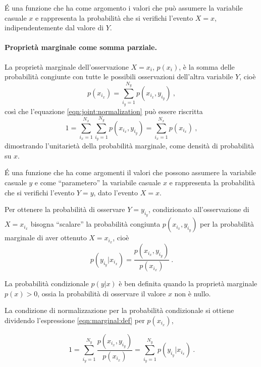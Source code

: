 \begin{definition}
   \'E una funzione che ha come argomento i valori che può assumere la variabile casuale $x$ e rappresenta la probabilità che si verifichi l'evento $X=x$, indipendentemente dal valore di $Y$.
\end{definition}

\paragraph{Proprietà marginale come somma parziale.} La proprietà marginale dell'osservazione $X=x_i$, $p(x_i)$, è la somma delle probabilità congiunte con tutte le possibili osservazioni dell'altra variabile $Y$, cioè
\begin{equation}\label{eqn:marginal:def}
    p(x_{i_x}) = \sum_{i_y = 1}^{N_y} p(x_{i_x}, y_{i_y}) \ ,
\end{equation}
così che l'equazione \ref{eqn:joint:normalization} può essere riscritta
\begin{equation}
    1 = \sum_{i_x = 1}^{N_x} \sum_{i_y = 1}^{N_y} p(x_{i_x}, y_{i_y}) = 
        \sum_{i_x = 1}^{N_x} p(x_{i_x}) \ ,
\end{equation}
dimostrando l'unitarietà della probabilità marginale, come densità di probabilità su $x$.

\begin{definition}
   \'E una funzione che ha come argomenti il valori che possono assumere la variabile casuale $y$ e come ``parametero'' la variabile casuale $x$ e rappresenta la probabilità che si verifichi l'evento $Y=y$, dato l'evento $X=x$.
\end{definition}
Per ottenere la probabilità di osservare $Y=y_{i_y}$, condizionato all'osservazione di $X=x_{i_x}$ bisogna ``scalare'' la probabilità congiunta $p(x_{i_x},y_{i_y})$ per la probabilità marginale di aver ottenuto $X=x_{i_x}$, cioè
\begin{equation}\label{eqn:conditional:def}
    p(y_{i_y}|x_{i_x}) = \dfrac{p(x_{i_x},y_{i_y})}{p(x_{i_x})} \ .
\end{equation}

\begin{note} La probabilità condizionale $p(y|x)$ è ben definita quando la proprietà marginale $p(x) > 0$, ossia la probabilità di osservare il valore $x$ non è nullo.
\end{note}
\begin{note} La condizione di normalizzazione per la probabilità condizionale si ottiene dividendo l'espressione \ref{eqn:marginal:def} per $p(x_{i_x})$,
\end{note}
\begin{equation}
    1 = \sum_{i_y = 1}^{N_y} \dfrac{p(x_{i_x}, y_{i_y})}{p(x_{i_x})} = \sum_{i_y = 1}^{N_y} p(y_{i_y}|x_{i_x}) \ .
\end{equation}


